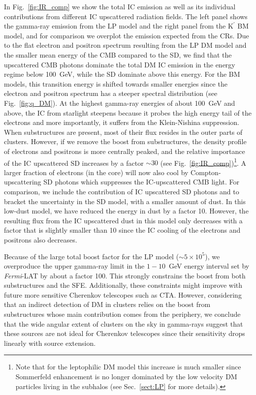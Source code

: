 \documentclass[10pt,aps,pra,reprint,amsmath,amsfonts,amssymb,showpacs,nofootinbib,floatfix]{revtex4-1}
\newcommand{\Fermi}{{\em Fermi}\xspace}
\newcommand{\rmn}{\mathrm}
\newcommand{\Kp}{\rmn{K}^\prime}
\begin{document}
In Fig.~\ref{fig:IR_comp} we show the total IC emission as well as its
individual contributions from different IC upscattered radiation
fields. The left panel shows the gamma-ray emission from the LP model
and the right panel from the $\Kp$ BM model, and for comparison we
overplot the emission expected from the CRs. Due to the flat electron
and positron spectrum resulting from the LP DM model and the smaller
mean energy of the CMB compared to the SD, we find that the
upscattered CMB photons dominate the total DM IC emission in the
energy regime below 100~GeV, while the SD dominate above this
energy. For the BM models, this transition energy is shifted towards
smaller energies since the electron and positron spectrum has a
steeper spectral distribution (see Fig.~\ref{fig:q_DM}). At the
highest gamma-ray energies of about 100~GeV and above, the IC from
starlight steepens because it probes the high energy tail of the
electrons and more importantly, it suffers from the Klein-Nishina
suppression. When substructures are present, most of their flux
resides in the outer parts of clusters. However, if we remove the
boost from substructures, the density profile of electrons and
positrons is more centrally peaked, and the relative importance of the
IC upscattered SD increases by a factor $\sim 30$ (see
Fig.~\ref{fig:IR_comp})\footnote{Note that for the leptophilic DM
  model this increase is much smaller since Sommerfeld enhancement is
  no longer dominated by the low velocity DM particles living in the
  subhalos (see Sec.~\ref{sect:LP} for more details).}. A larger
fraction of electrons (in the core) will now also cool by
Compton-upscattering SD photons which suppresses the IC-upscattered
CMB light. For comparison, we include the contribution of IC
upscattered SD photons and to bracket the uncertainty in the SD model,
with a smaller amount of dust. In this low-dust model, we have reduced
the energy in dust by a factor 10. However, the resulting flux from
the IC upscattered dust in this model only decreases with a factor
that is slightly smaller than 10 since the IC cooling of the electrons
and positrons also decreases.

Because of the large total boost factor for the LP model ($\sim5\times
10^5$), we overproduce the upper gamma-ray limit in the $1-10$~GeV
energy interval set by \Fermi-LAT by about a factor 100. This strongly
constrains the boost from both substructures and the
SFE. Additionally, these constraints might improve with future more
sensitive Cherenkov telescopes such as CTA. However, considering that
an indirect detection of DM in clusters relies on the boost from
substructures whose main contribution comes from the periphery, we
conclude that the wide angular extent of clusters on the sky in
gamma-rays suggest that these sources are not ideal for Cherenkov
telescopes since their sensitivity drops linearly with source
extension.
\end{document}
